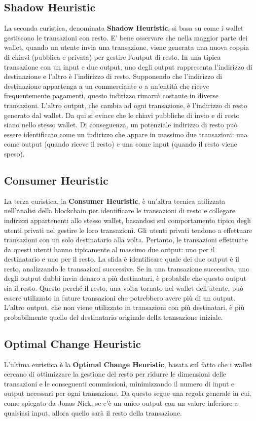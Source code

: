 \subsection{Shadow Heuristic}
La seconda euristica, denominata \textbf{Shadow Heuristic}, si basa su come i wallet gestiscono le transazioni con resto. E' bene osservare che nella maggior parte dei wallet, quando un utente invia una transazione, viene generata una nuova coppia di chiavi (pubblica e privata) per gestire l'output di resto. In una tipica transazione con un input e due output, uno degli output rappresenta l'indirizzo di destinazione e l'altro è l'indirizzo di resto. Supponendo che l'indirizzo di destinazione appartenga a un commerciante o a un'entità che riceve frequentemente pagamenti, questo indirizzo rimarrà costante in diverse transazioni. L'altro output, che cambia ad ogni transazione, è l'indirizzo di resto generato dal wallet. Da qui si evince che le chiavi pubbliche di invio e di resto siano nello stesso wallet. Di conseguenza, un potenziale indirizzo di resto può essere identificato come un indirizzo che appare in massimo due transazioni: una come output (quando riceve il resto) e una come input (quando il resto viene speso).

\subsection{Consumer Heuristic}
La terza euristica, la \textbf{Consumer Heuristic}, è un'altra tecnica utilizzata nell'analisi della blockchain per identificare le transazioni di resto e collegare indirizzi appartenenti allo stesso wallet, basandosi sul comportamento tipico degli utenti privati nel gestire le loro transazioni. Gli utenti privati tendono a effettuare transazioni con un solo destinatario alla volta. Pertanto, le transazioni effettuate da questi utenti hanno tipicamente al massimo due output: uno per il destinatario e uno per il resto. La sfida è identificare quale dei due output è il resto, analizzando le transazioni successive. Se in una transazione successiva, uno degli output dubbi invia denaro a più destinatari, è probabile che questo output sia il resto. Questo perché il resto, una volta tornato nel wallet dell'utente, può essere utilizzato in future transazioni che potrebbero avere più di un output. L'altro output, che non viene utilizzato in transazioni con più destinatari, è più probabilmente quello del destinatario originale della transazione iniziale.

\subsection{Optimal Change Heuristic}
L'ultima euristica è la \textbf{Optimal Change Heuristic}, basata sul fatto che i wallet cercano di ottimizzare la gestione del resto per ridurre le dimensioni delle transazioni e le conseguenti commissioni, minimizzando il numero di input e output necessari per ogni transazione. Da questo segue una regola generale in cui, come spiegato da Jonas Nick, se c'è un unico output con un valore inferiore a qualsiasi input, allora quello sarà il resto della transazione.

